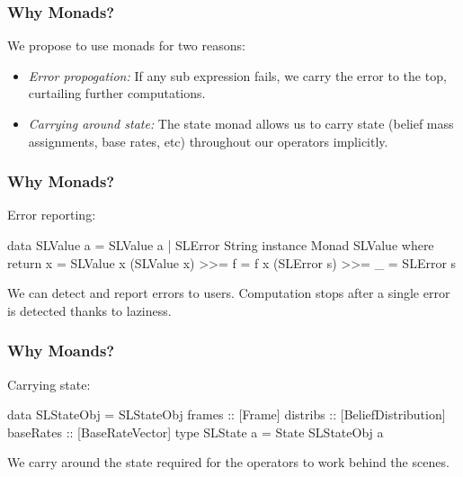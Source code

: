\documentclass{beamer}
\begin{document}






\begin{frame}
\frametitle{Why Monads?}

We propose to use monads for two reasons:

\begin{itemize}
  \item \emph{Error propogation:} If any sub expression fails, we carry the
    error to the top, curtailing further computations.
  \item \emph{Carrying around state:} The state monad allows us to carry state
    (belief mass assignments, base rates, etc) throughout our operators implicitly.
\end{itemize}

\end{frame}


\begin{frame}[fragile]
\frametitle{Why Monads?}

Error reporting:

\begin{code}
data SLValue a = SLValue a | SLError String
instance Monad SLValue where
  return x = SLValue x
  (SLValue x) >>= f = f x
  (SLError s) >>= _ = SLError s
\end{code}

We can detect and report errors to users. Computation stops after a single
error is detected thanks to laziness.

\end{frame}


\begin{frame}[fragile]
\frametitle{Why Moands?}

Carrying state:

\begin{code}
data SLStateObj = SLStateObj {
  frames :: [Frame]
  distribs :: [BeliefDistribution]
  baseRates :: [BaseRateVector]
}
type SLState a = State SLStateObj a
\end{code}

We carry around the state required for the operators to work behind the scenes.

\end{frame}
\end{document}
